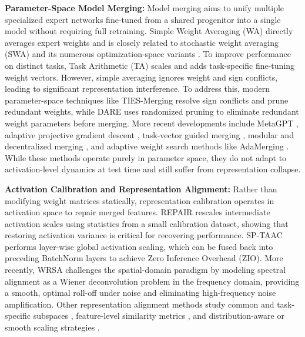 \documentclass{article}
\theoremstyle{plain}
\theoremstyle{definition}
\theoremstyle{remark}
\begin{document}
\textbf{Parameter-Space Model Merging:} Model merging aims to unify multiple specialized expert networks fine-tuned from a shared progenitor into a single model without requiring full retraining. Simple Weight Averaging (WA) \cite{wortsman2022model} directly averages expert weights and is closely related to stochastic weight averaging (SWA) and its numerous optimization-space variants \cite{kaddour2022afair, maddox2019asimple, nikishin2018improving, cao2024deep, gu2023hierarchical, moralesbrotons2024exponential, ran2022improved, wang2024aunified, shin2020sqwa, athiwaratkun2018improving, guo2022stochastic, nam2022improving, shen2023shortterm, seckler2022bayesian}. To improve performance on distinct tasks, Task Arithmetic (TA) \cite{ilharco2022editing, bhardwaj2024language, sun2025task, ilharco2022editing_1, yoshida2025mastering} scales and adds task-specific fine-tuning weight vectors. However, simple averaging ignores weight and sign conflicts, leading to significant representation interference. To address this, modern parameter-space techniques like TIES-Merging \cite{yadav2023ties} resolve sign conflicts and prune redundant weights, while DARE \cite{yu2024language} uses randomized pruning to eliminate redundant weight parameters before merging. More recent developments include MetaGPT \cite{zhou2024metagpt}, adaptive projective gradient descent \cite{wei2025modeling}, task-vector guided merging \cite{cheng2025whoever}, modular and decentralized merging \cite{li2025model, tang2025merging, corbeil2025amodular, gargiulo2024task, sun2025cat, yang2025mix, yuan2025superficial}, and adaptive weight search methods like AdaMerging \cite{yang2023adamerging, panariello2025accurate, du2025adamms}. While these methods operate purely in parameter space, they do not adapt to activation-level dynamics at test time and still suffer from representation collapse.

\textbf{Activation Calibration and Representation Alignment:} Rather than modifying weight matrices statically, representation calibration operates in activation space to repair merged features. REPAIR \cite{jordan2023repair} rescales intermediate activation scales using statistics from a small calibration dataset, showing that restoring activation variance is critical for recovering performance. SP-TAAC \cite{mspr2026} performs layer-wise global activation scaling, which can be fused back into preceding BatchNorm layers to achieve Zero Inference Overhead (ZIO). More recently, WRSA \cite{wrsa2026} challenges the spatial-domain paradigm by modeling spectral alignment as a Wiener deconvolution problem in the frequency domain, providing a smooth, optimal roll-off under noise and eliminating high-frequency noise amplification. Other representation alignment methods study common and task-specific subspaces \cite{marczak2025notask, chen2025bring}, feature-level similarity metrics \cite{he2024localizeandstitch, naganuma2025onfairness, ortizjimnez2023task, singal2025task, jin2024finetuning, su2024task}, and distribution-aware or smooth scaling strategies \cite{shirafuji2024bias, tao2024task, rachwa2026smooth, lv2021distributionaware}.
\end{document}
